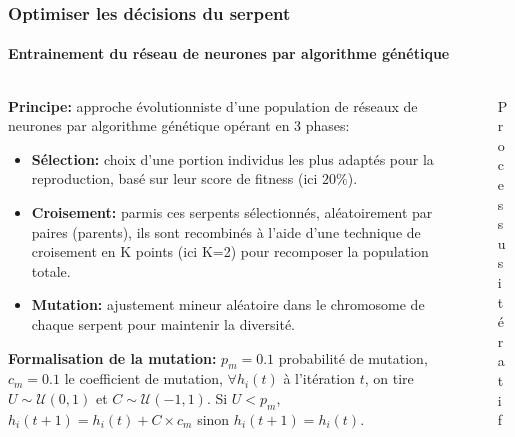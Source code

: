 \documentclass[10pt]{beamer}
\begin{document}
\begin{frame}
\frametitle{Optimiser les décisions du serpent}
\framesubtitle{Entrainement du réseau de neurones par algorithme génétique}
\begin{columns}[T]
\begin{column}{0.60\textwidth}
\footnotesize

\textbf{Principe:} approche évolutionniste d'une population de réseaux de neurones par algorithme génétique opérant en 3 phases:
\begin{itemize}
  \item \textbf{Sélection:} choix d'une portion individus les plus adaptés pour la reproduction, basé sur leur score de fitness (ici $20\%$).
  \item \textbf{Croisement:} parmis ces serpents sélectionnés, aléatoirement par paires (parents), ils sont recombinés à l'aide d'une technique de croisement en K points (ici K=2) pour recomposer la population totale.
  \item \textbf{Mutation:} ajustement mineur aléatoire dans le chromosome de chaque serpent pour maintenir la diversité.
\end{itemize}

\textbf{Formalisation de la mutation:} $p_m=0.1$ probabilité de mutation, $c_m=0.1$ le coefficient de mutation, $\forall h_i(t)$ à l'itération $t$, on tire $U \sim \mathcal{U}(0, 1)$ et $C \sim \mathcal{U}(-1, 1)$. Si $U<p_m$, $h_i(t+1)=h_i(t)+C\times c_m$ sinon $h_i(t+1)=h_i(t)$.
\end{column}

\begin{column}{0.40\textwidth}

\begin{figure}
\centering
\caption*{\tiny Processus itératif}
\end{figure}


\end{column}
\end{columns}
\end{frame}
\end{document}
